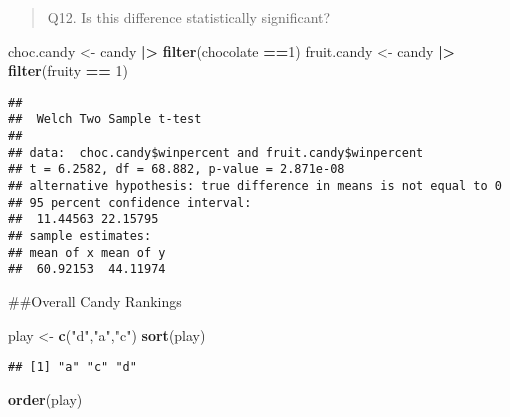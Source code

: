 \documentclass[
]{article}
\newenvironment{Shaded}{\begin{snugshade}}{\end{snugshade}}
\newcommand{\DecValTok}[1]{\textcolor[rgb]{0.00,0.00,0.81}{#1}}
\newcommand{\FunctionTok}[1]{\textcolor[rgb]{0.13,0.29,0.53}{\textbf{#1}}}
\newcommand{\NormalTok}[1]{#1}
\newcommand{\OtherTok}[1]{\textcolor[rgb]{0.56,0.35,0.01}{#1}}
\newcommand{\SpecialCharTok}[1]{\textcolor[rgb]{0.81,0.36,0.00}{\textbf{#1}}}
\newcommand{\StringTok}[1]{\textcolor[rgb]{0.31,0.60,0.02}{#1}}
\begin{document}
\begin{quote}
Q12. Is this difference statistically significant?
\end{quote}

\begin{Shaded}
\begin{Highlighting}[]
\NormalTok{choc.candy }\OtherTok{\textless{}{-}}\NormalTok{ candy }\SpecialCharTok{|\textgreater{}} \FunctionTok{filter}\NormalTok{(chocolate }\SpecialCharTok{==}\DecValTok{1}\NormalTok{)}
\NormalTok{fruit.candy }\OtherTok{\textless{}{-}}\NormalTok{ candy }\SpecialCharTok{|\textgreater{}} \FunctionTok{filter}\NormalTok{(fruity }\SpecialCharTok{==} \DecValTok{1}\NormalTok{)}
\end{Highlighting}
\end{Shaded}

\begin{Shaded}
\end{Shaded}

\begin{verbatim}
## 
##  Welch Two Sample t-test
## 
## data:  choc.candy$winpercent and fruit.candy$winpercent
## t = 6.2582, df = 68.882, p-value = 2.871e-08
## alternative hypothesis: true difference in means is not equal to 0
## 95 percent confidence interval:
##  11.44563 22.15795
## sample estimates:
## mean of x mean of y 
##  60.92153  44.11974
\end{verbatim}

\#\#Overall Candy Rankings

\begin{Shaded}
\begin{Highlighting}[]
\NormalTok{play }\OtherTok{\textless{}{-}} \FunctionTok{c}\NormalTok{(}\StringTok{"d"}\NormalTok{,}\StringTok{"a"}\NormalTok{,}\StringTok{"c"}\NormalTok{)}
\FunctionTok{sort}\NormalTok{(play)}
\end{Highlighting}
\end{Shaded}

\begin{verbatim}
## [1] "a" "c" "d"
\end{verbatim}

\begin{Shaded}
\begin{Highlighting}[]
\FunctionTok{order}\NormalTok{(play)}
\end{Highlighting}
\end{Shaded}
\end{document}
